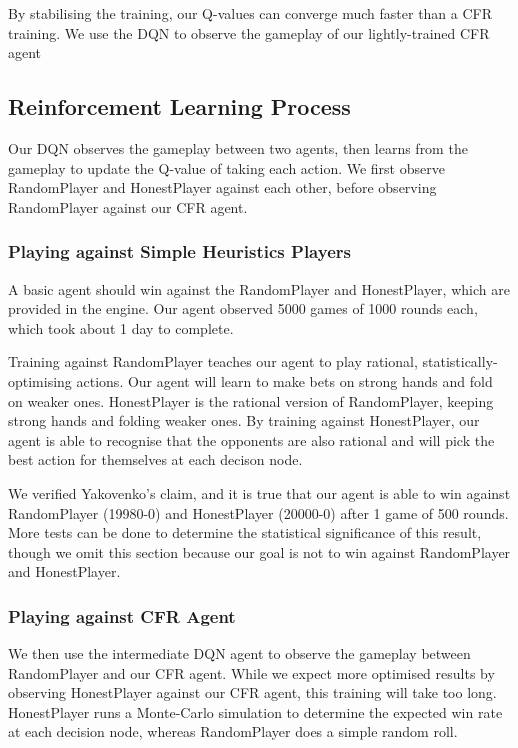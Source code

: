\documentclass{article}
\begin{document}
By stabilising the training, our Q-values can converge much faster than a CFR training. We use the DQN to observe the gameplay of our lightly-trained CFR agent

\subsection{Reinforcement Learning Process}

Our DQN observes the gameplay between two agents, then learns from the gameplay to update the Q-value of taking each action. We first observe RandomPlayer and HonestPlayer against each other, before observing RandomPlayer against our CFR agent.

\subsubsection{Playing against Simple Heuristics Players}
A basic agent should win against the RandomPlayer and HonestPlayer, which are provided in the engine. Our agent observed 5000 games of 1000 rounds each, which took about 1 day to complete.

Training against RandomPlayer teaches our agent to play rational, statistically-optimising actions. Our agent will learn to make bets on strong hands and fold on weaker ones. HonestPlayer is the rational version of RandomPlayer, keeping strong hands and folding weaker ones. By training against HonestPlayer, our agent is able to recognise that the opponents are also rational and will pick the best action for themselves at each decison node.

We verified Yakovenko's claim, and it is true that our agent is able to win against RandomPlayer (19980-0) and HonestPlayer (20000-0) after 1 game of 500 rounds. More tests can be done to determine the statistical significance of this result, though we omit this section because our goal is not to win against RandomPlayer and HonestPlayer.

\subsubsection{Playing against CFR Agent}

We then use the intermediate DQN agent to observe the gameplay between RandomPlayer and our CFR agent. While we expect more optimised results by observing HonestPlayer against our CFR agent, this training will take too long. HonestPlayer runs a Monte-Carlo simulation to determine the expected win rate at each decision node, whereas RandomPlayer does a simple random roll.
\end{document}
